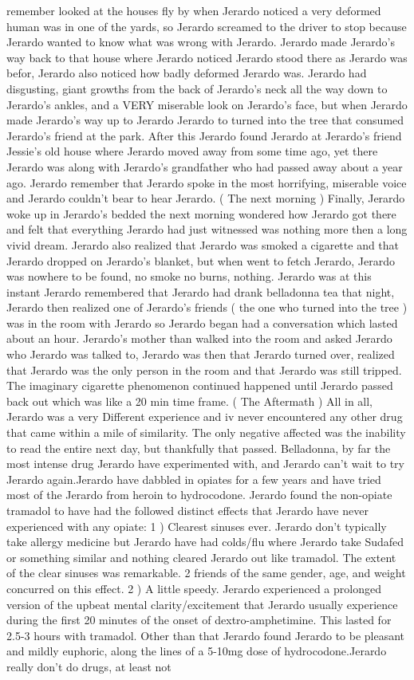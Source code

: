 \documentclass[12pt]{book}
\begin{document}
remember looked at the houses fly by when Jerardo noticed a very deformed human was in one of the yards, so Jerardo screamed to the driver to stop because Jerardo wanted to know what was wrong with Jerardo. Jerardo made Jerardo's way back to that house where Jerardo noticed Jerardo stood there as Jerardo was befor, Jerardo also noticed how badly deformed Jerardo was. Jerardo had disgusting, giant growths from the back of Jerardo's neck all the way down to Jerardo's ankles, and a VERY miserable look on Jerardo's face, but when Jerardo made Jerardo's way up to Jerardo Jerardo to turned into the tree that consumed Jerardo's friend at the park. After this Jerardo found Jerardo at Jerardo's friend Jessie's old house where Jerardo moved away from some time ago, yet there Jerardo was along with Jerardo's grandfather who had passed away about a year ago. Jerardo remember that Jerardo spoke in the most horrifying, miserable voice and Jerardo couldn't bear to hear Jerardo. ( The next morning ) Finally, Jerardo woke up in Jerardo's bedded the next morning wondered how Jerardo got there and felt that everything Jerardo had just witnessed was nothing more then a long vivid dream. Jerardo also realized that Jerardo was smoked a cigarette and that Jerardo dropped on Jerardo's blanket, but when went to fetch Jerardo, Jerardo was nowhere to be found, no smoke no burns, nothing. Jerardo was at this instant Jerardo remembered that Jerardo had drank belladonna tea that night, Jerardo then realized one of Jerardo's friends ( the one who turned into the tree ) was in the room with Jerardo so Jerardo began had a conversation which lasted about an hour. Jerardo's mother than walked into the room and asked Jerardo who Jerardo was talked to, Jerardo was then that Jerardo turned over, realized that Jerardo was the only person in the room and that Jerardo was still tripped. The imaginary cigarette phenomenon continued happened until Jerardo passed back out which was like a 20 min time frame. ( The Aftermath ) All in all, Jerardo was a very Different experience and iv never encountered any other drug that came within a mile of similarity. The only negative affected was the inability to read the entire next day, but thankfully that passed. Belladonna, by far the most intense drug Jerardo have experimented with, and Jerardo can't wait to try Jerardo again.Jerardo have dabbled in opiates for a few years and have tried most of the Jerardo from heroin to hydrocodone. Jerardo found the non-opiate tramadol to have had the followed distinct effects that Jerardo have never experienced with any opiate: 1 ) Clearest sinuses ever. Jerardo don't typically take allergy medicine but Jerardo have had colds/flu where Jerardo take Sudafed or something similar and nothing cleared Jerardo out like tramadol. The extent of the clear sinuses was remarkable. 2 friends of the same gender, age, and weight concurred on this effect. 2 ) A little speedy. Jerardo experienced a prolonged version of the upbeat mental clarity/excitement that Jerardo usually experience during the first 20 minutes of the onset of dextro-amphetimine. This lasted for 2.5-3 hours with tramadol. Other than that Jerardo found Jerardo to be pleasant and mildly euphoric, along the lines of a 5-10mg dose of hydrocodone.Jerardo really don't do drugs, at least not 
\end{document}
